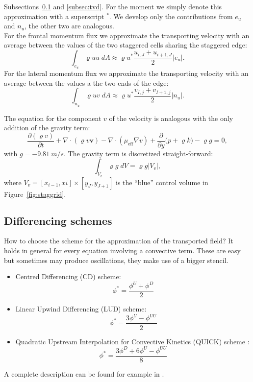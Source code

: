 \begin{itemize}
	Subsections~\ref{subsec:diffscheme} and \ref{subsec:tvd}. For the moment we 
	simply denote this approximation with a superscript $^*$.
	We develop only the contributions from $e_u$ and $n_u$, the other two are 
	analogous.\\
	For the frontal momentum flux we approximate the transporting velocity with 
	an average between the values of the two staggered cells sharing the 
	staggered edge:
	\begin{equation}
		\int_{e_u} \varrho u u \; dA \approx \varrho u^* \frac{u_{i,J} + 
		u_{i+1,J}}{2}|e_u|.
	\end{equation}
	For the lateral momentum flux we approximate the transporting velocity with 
	an average between the values a the two ends of the edge:
	\begin{equation}
	\int_{n_u} \varrho u v \; dA \approx \varrho u^* \frac{v_{I,j} 
	+v_{I+1,j}}{2} |n_u|.
	\end{equation}
\end{itemize}

The equation for the component $v$ of the velocity is analogous with the only 
addition of the gravity term:
\begin{equation}
\frac{\partial{(\varrho v)}}{\partial t} + \nabla \cdot (\varrho v 
\mathbf{v}) - \nabla \cdot (\mu_\text{eff} \nabla v) + 
\frac{\partial}{\partial y} \big(p + \varrho k\big) - \varrho g= 0,
\end{equation}
with $g = \SI{-9.81}{m/s}$. The gravity term is discretized straight-forward:
\begin{equation}
\int_{V_v} \varrho g \; dV = \varrho g |V_v|,
\end{equation}
where $V_v = [x_{i-1}, xi] \times [y_J, y_{J+1}]$ is the ``blue'' control 
volume in 
Figure~\ref{fig:staggrid}. 

%
\subsection{Differencing schemes} \label{subsec:diffscheme} %
How to choose the scheme for the approximation of the transported field?
It holds in general for every equation involving a convective term.
These are easy but sometimes may produce oscillations, they make use of a 
bigger stencil.
\begin{itemize}
\item Centred Differencing (CD) scheme:
\begin{equation} \label{eq:cd}
\phi^* = \frac{\phi^U + \phi^D}{2}
\end{equation}
\item Linear Upwind Differencing (LUD) scheme:
\begin{equation} \label{eq:lud}
\phi^* = \frac{3\phi^U - \phi^{UU}}{2}
\end{equation}
\item Quadratic Upstream Interpolation for Convective Kinetics (QUICK) scheme 
\cite{fv:leonard}:
\begin{equation} \label{eq:quick}
	\phi^* = \frac{3\phi^D + 6 \phi^U - \phi^{UU}}{8}
\end{equation}
\end{itemize}
A complete description can be found for example in \cite{main:vermal}.
